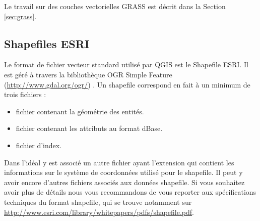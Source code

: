Le travail sur des couches vectorielles GRASS est décrit dans la Section \ref{sec:grass}.

\subsection{Shapefiles ESRI}

Le format de fichier vecteur standard utilisé par QGIS est le Shapefile ESRI. Il est géré à travers la bibliothèque OGR Simple Feature  (\url{http://www.gdal.org/ogr/}) . Un shapefile correspond en fait à un minimum de trois fichiers : 

\begin{itemize}
\item {} fichier contenant la géométrie des entités.
\item {} fichier contenant les attributs au format dBase.
\item {} fichier d'index.
\end{itemize}

Dans l'idéal y est associé un autre fichier ayant l'extension  qui contient les informations sur le système de coordonnées utilisé pour le shapefile. Il peut y avoir encore d'autres fichiers associés aux données shapefile. Si vous souhaitez avoir plus de détails nous vous recommandons de vous reporter aux spécifications techniques du format shapefile, qui se trouve notamment sur \url{http://www.esri.com/library/whitepapers/pdfs/shapefile.pdf}.

